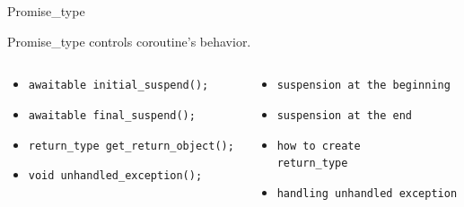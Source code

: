 \documentclass[10pt]{beamer}
\begin{document}
\begin{frame}{Promise\_type}
	\centerline{Promise\_type controls coroutine's behavior.}
	\vfill

	\begin{columns}
		\begin{column}{0.48\linewidth}
			\begin{footnotesize}
			\begin{itemize}[<+-|alert@+>]
				\item \texttt{awaitable initial\_suspend();}
				\item \texttt{awaitable final\_suspend();}
				\item \texttt{return\_type get\_return\_object();}
				\item \texttt{void unhandled\_exception();}
			\end{itemize}
			\end{footnotesize}	
		\end{column}
		\begin{column}{0.48\linewidth}
			\begin{footnotesize}
			\begin{itemize}
				\item<1- |alert@1> \texttt{suspension at the beginning}
				\item<2- |alert@2> \texttt{suspension at the end}
				\item<3- |alert@3> \texttt{how to create \\ return\_type}
				\item<4- |alert@4> \texttt{handling unhandled exception}
			\end{itemize}
			\end{footnotesize}	
		\end{column}
	\end{columns}
\end{frame}
\end{document}
